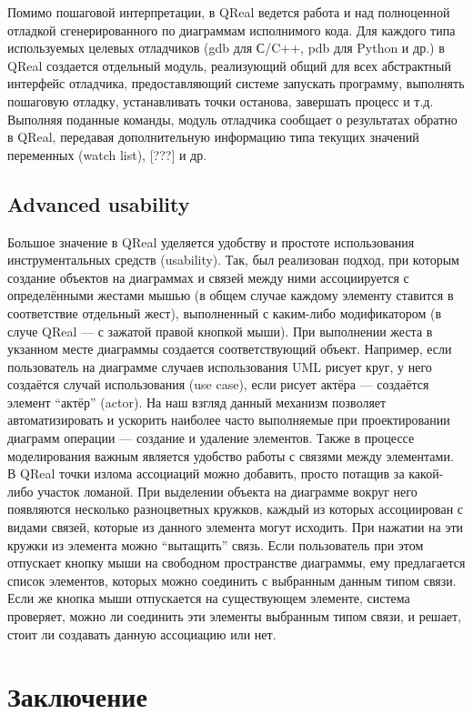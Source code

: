 \documentclass[a4paper]{article}
\begin{document}
Помимо пошаговой интерпретации, в QReal ведется работа и над полноценной отладкой сгенерированного по диаграммам исполнимого кода. Для каждого типа используемых целевых отладчиков (gdb для С/C++, pdb для Python и др.) в QReal создается отдельный модуль, реализующий общий для всех абстрактный интерфейс отладчика, предоставляющий системе запускать программу, выполнять пошаговую отладку, устанавливать точки останова, завершать процесс и т.д. Выполняя поданные команды, модуль отладчика сообщает о результатах обратно в QReal, передавая дополнительную информацию типа текущих значений переменных (watch list), [???] и др. 
  
\subsection{Advanced usability}

Большое значение в QReal уделяется удобству и простоте использования инструментальных средств (usability). Так, был реализован подход, при которым создание объектов на диаграммах и связей между ними ассоциируется с определёнными жестами мышью (в общем случае каждому элементу ставится в соответствие отдельный жест), выполненный с каким-либо модификатором (в случе QReal --- с зажатой правой кнопкой мыши). При выполнении жеста в укзанном месте диаграммы создается соответствующий объект. Например, если пользователь на диаграмме случаев использования UML рисует круг, у него создаётся случай использования (use case), если рисует актёра --- создаётся элемент ``актёр'' (actor). На наш взгляд данный механизм позволяет автоматизировать и ускорить наиболее часто выполняемые при проектировании диаграмм операции --- создание и удаление элементов. Также в процессе моделирования важным является удобство работы с связями между элементами. В QReal точки излома ассоциаций можно добавить, просто потащив за какой-либо участок ломаной. При выделении объекта на диаграмме вокруг него появляются несколько разноцветных кружков, каждый из которых ассоциирован с видами связей, которые из данного элемента могут исходить. При нажатии на эти кружки из элемента можно “вытащить” связь. Если пользователь при этом отпускает кнопку мыши на свободном пространстве диаграммы, ему предлагается список элементов, которых можно соединить с выбранным данным типом связи. Если же кнопка мыши отпускается на существующем элементе, система проверяет, можно ли соединить эти элементы выбранным типом связи, и решает, стоит ли создавать данную ассоциацию или нет. 

\section{Заключение}
\end{document}

